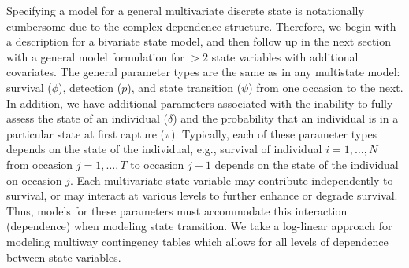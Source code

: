 \documentclass[sts]{imsart}
\numberwithin{equation}{section}
\theoremstyle{plain}
\begin{document}
Specifying a model for a general multivariate discrete state is notationally cumbersome due to the complex dependence structure. Therefore, we begin with a description for a bivariate state model, and then follow up in the next section with a general model formulation for $>2$ state variables with additional covariates. The general parameter types are the same as in any multistate model: survival ($\phi$), detection ($p$), and state transition ($\psi$) from one occasion to the next. In addition, we have additional parameters associated with the inability to fully assess the state of an individual ($\delta$) and the probability that an individual is in a particular state at first capture ($\pi$). Typically, each of these parameter types depends on the state of the individual, e.g., survival of individual $i=1,\dots,N$ from occasion $j=1,\dots,T$ to occasion $j+1$ depends on the state of the individual on occasion $j$. Each multivariate state variable may contribute independently to survival, or may interact at various levels to further enhance or degrade survival. Thus, models for these parameters must accommodate this interaction (dependence) when modeling state transition. We take a log-linear approach \citep{christensen1997log} for modeling multiway contingency tables which allows for all levels of dependence between state variables.     
\end{document}
